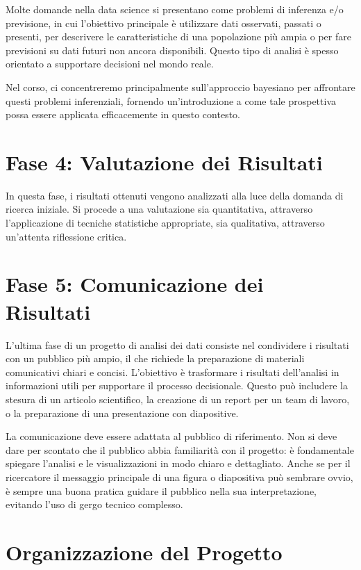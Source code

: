 \documentclass[
  letterpaper,
  DIV=11,
  numbers=noendperiod]{scrreprt}
\theoremstyle{definition}
\theoremstyle{remark}
\begin{document}
Molte domande nella data science si presentano come problemi di
inferenza e/o previsione, in cui l'obiettivo principale è utilizzare
dati osservati, passati o presenti, per descrivere le caratteristiche di
una popolazione più ampia o per fare previsioni su dati futuri non
ancora disponibili. Questo tipo di analisi è spesso orientato a
supportare decisioni nel mondo reale.

Nel corso, ci concentreremo principalmente sull'approccio bayesiano per
affrontare questi problemi inferenziali, fornendo un'introduzione a come
tale prospettiva possa essere applicata efficacemente in questo
contesto.

\section{Fase 4: Valutazione dei
Risultati}\label{fase-4-valutazione-dei-risultati}

In questa fase, i risultati ottenuti vengono analizzati alla luce della
domanda di ricerca iniziale. Si procede a una valutazione sia
quantitativa, attraverso l'applicazione di tecniche statistiche
appropriate, sia qualitativa, attraverso un'attenta riflessione critica.

\section{Fase 5: Comunicazione dei
Risultati}\label{fase-5-comunicazione-dei-risultati}

L'ultima fase di un progetto di analisi dei dati consiste nel
condividere i risultati con un pubblico più ampio, il che richiede la
preparazione di materiali comunicativi chiari e concisi. L'obiettivo è
trasformare i risultati dell'analisi in informazioni utili per
supportare il processo decisionale. Questo può includere la stesura di
un articolo scientifico, la creazione di un report per un team di
lavoro, o la preparazione di una presentazione con diapositive.

La comunicazione deve essere adattata al pubblico di riferimento. Non si
deve dare per scontato che il pubblico abbia familiarità con il
progetto: è fondamentale spiegare l'analisi e le visualizzazioni in modo
chiaro e dettagliato. Anche se per il ricercatore il messaggio
principale di una figura o diapositiva può sembrare ovvio, è sempre una
buona pratica guidare il pubblico nella sua interpretazione, evitando
l'uso di gergo tecnico complesso.

\section{Organizzazione del Progetto}\label{organizzazione-del-progetto}
\end{document}
